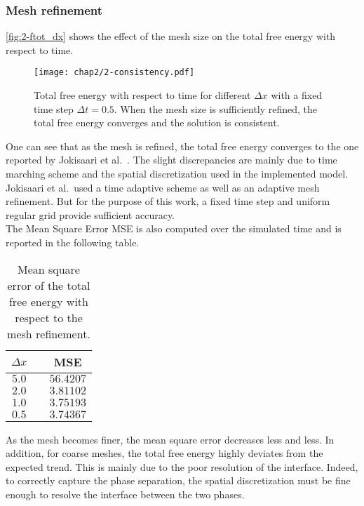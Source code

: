     \subsubsection{Mesh refinement}
    \autoref{fig:2-ftot_dx} shows the effect of the mesh size on the total free energy with respect to time.
    \begin{figure}[H]
        \centering
        \texttt{[image: chap2/2-consistency.pdf]}
        \caption{Total free energy with respect to time for different $\Delta x$ with a fixed time step $\Delta t = 0.5$. When the mesh size is sufficiently refined, the total free energy converges and the solution is consistent.}
        \label{fig:2-ftot_dx}
    \end{figure}
    One can see that as the mesh is refined, the total free energy converges to the one reported by Jokisaari et al.\ \cite{JokisaariVoorheesGuyerWarrenHeinonen2017}. The slight discrepancies are mainly due to time marching scheme and the spatial discretization used in the implemented model. Jokisaari et al.\ used a time adaptive scheme as well as an adaptive mesh refinement. But for the purpose of this work, a fixed time step and uniform regular grid provide sufficient accuracy.\\
    The Mean Square Error MSE is also computed over the simulated time and is reported in the following table.
    \begin{table}[H]
        \centering
        \begin{tabular}{ccc}
            \hline
            $\Delta x$ && MSE \\
            \hline
            $5.0$ && $56.4207$ \\
            $2.0$ && $3.81102$ \\
            $1.0$ && $3.75193$ \\
            $0.5$ && $3.74367$ \\
            \hline
        \end{tabular}
        \caption{Mean square error of the total free energy with respect to the mesh refinement.}
        \label{tab:ftot_mse}
    \end{table}
    As the mesh becomes finer, the mean square error decreases less and less.
    In addition, for coarse meshes, the total free energy highly deviates from the expected trend. This is mainly due to the poor resolution of the interface. Indeed, to correctly capture the phase separation, the spatial discretization must be fine enough to resolve the interface between the two phases.
